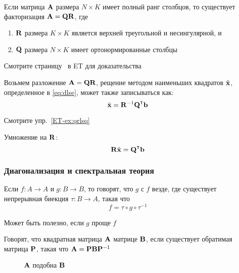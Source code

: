 \begin{frame}

     \vspace{2em}
    \Thm{\eqref{ET-t:qr}}
    Если матрица $\mathbf A$ размера $N \times K$ имеет полный ранг столбцов, 
    то существует факторизация $\mathbf A = \mathbf Q \mathbf R$, где
    \begin{enumerate}
        \item $\mathbf R$ размера $K \times K$ является верхней треугольной и несингулярной, и 
        \item $\mathbf Q$ размера $N \times K$ имеет ортонормированные столбцы
    \end{enumerate}
    Смотрите страницу~\pageref{ET-t:qr} в ET для доказательства
    
\end{frame}

\begin{frame}

     \vspace{2em}
    Возьмем разложение $\mathbf A = \mathbf Q \mathbf R$, рещение методом наименьших квадратов
    $\hat {\mathbf x}$, определенное в \eqref{eq:dlse}, может также записываться как:
    $$\hboldx =
    \boldR^{-1} \boldQ^\T \boldb$$
    
    Смотрите упр.~\ref{ET-ex:qrlsq}
    
    \vspace{.7em}
    Умножение на $\mathbf R$:
    $$\boldR \hboldx = \boldQ^\T \boldb$$
    
\end{frame}

\begin{frame}\frametitle{Диагонализация и спектральная теория}

     \vspace{2em}
    Если $f \colon A \to A$ и $g \colon B \to B$, то
    говорят, что $g$  с $f$ везде, где существует
    непрерывная биекция $\tau \colon B \to A$, такая что $$f = \tau \circ g \circ
    \tau^{-1}$$
    
    \vspace{.7em}
    Может быть полезно, если $g$ проще $f$
    
\end{frame}

\begin{frame}

    \vspace{2em}
    Говорят, что квадратная матрица $\mathbf A$  матрице $\mathbf B$, если 
    существует обратимая матрица $\mathbf P$, такая что $\mathbf A = \mathbf P \mathbf B \mathbf P^{-1}$

    \begin{figure}
   \begin{center}
    
    \caption{\label{f:diagonalize} $\mathbf A$ подобна $\mathbf B$}
   \end{center}
    \end{figure}
    
\end{frame}

